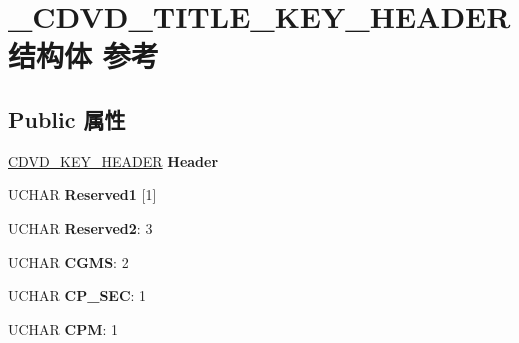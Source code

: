 \hypertarget{struct___c_d_v_d___t_i_t_l_e___k_e_y___h_e_a_d_e_r}{}\section{\+\_\+\+C\+D\+V\+D\+\_\+\+T\+I\+T\+L\+E\+\_\+\+K\+E\+Y\+\_\+\+H\+E\+A\+D\+E\+R结构体 参考}
\label{struct___c_d_v_d___t_i_t_l_e___k_e_y___h_e_a_d_e_r}
\subsection*{Public 属性}
\begin{DoxyCompactItemize}
\item 
\mbox{\label{struct___c_d_v_d___t_i_t_l_e___k_e_y___h_e_a_d_e_r_aced7530f505de0dd6aa3569230df530e}} 
\hyperlink{struct___c_d_v_d___k_e_y___h_e_a_d_e_r}{C\+D\+V\+D\+\_\+\+K\+E\+Y\+\_\+\+H\+E\+A\+D\+ER} {\bfseries Header}
\item 
\mbox{\label{struct___c_d_v_d___t_i_t_l_e___k_e_y___h_e_a_d_e_r_a1d98e7ebec6478dbdbfd8845ac6d3272}} 
U\+C\+H\+AR {\bfseries Reserved1} \mbox{[}1\mbox{]}
\item 
\mbox{\label{struct___c_d_v_d___t_i_t_l_e___k_e_y___h_e_a_d_e_r_ae964dc9fc3278961a152652cfec42b15}} 
U\+C\+H\+AR {\bfseries Reserved2}\+: 3
\item 
\mbox{\label{struct___c_d_v_d___t_i_t_l_e___k_e_y___h_e_a_d_e_r_aae1baf15b12afdd622b80fcd4d122b61}} 
U\+C\+H\+AR {\bfseries C\+G\+MS}\+: 2
\item 
\mbox{\label{struct___c_d_v_d___t_i_t_l_e___k_e_y___h_e_a_d_e_r_a88dfd41129617d43c7e7fd4efc2f7d98}} 
U\+C\+H\+AR {\bfseries C\+P\+\_\+\+S\+EC}\+: 1
\item 
\mbox{\label{struct___c_d_v_d___t_i_t_l_e___k_e_y___h_e_a_d_e_r_ab83352e53aad2bc4009a7ff4c697a0fb}} 
U\+C\+H\+AR {\bfseries C\+PM}\+: 1

\end{DoxyCompactItemize}
